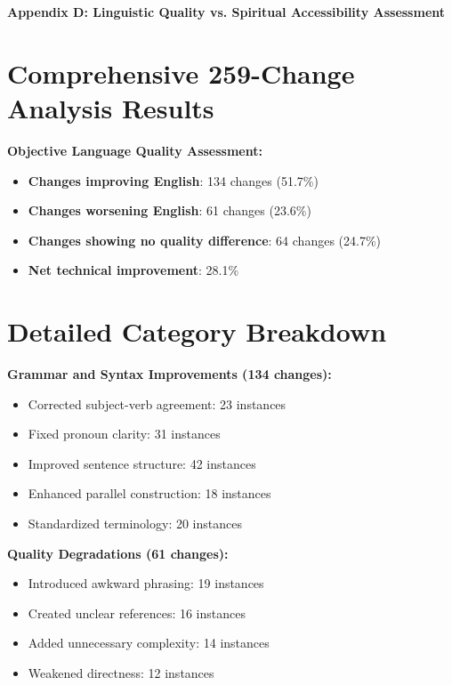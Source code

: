 \documentclass[11pt,twoside]{book}
\begin{document}
\clearpage
\pagestyle{sectionopening}
\thispagestyle{sectionopening}
\markboth{}{}
\markright{}
\vspace*{0.25\textheight}
\begin{center}
{\Huge\bfseries Appendix D: Linguistic Quality vs. Spiritual Accessibility Assessment}
\end{center}
\newpage
\section*{Comprehensive 259-Change Analysis Results}
\label{sec:orgb23dbeb}

\textbf{\textbf{Objective Language Quality Assessment:}}
\begin{itemize}
\item \textbf{\textbf{Changes improving English}}: 134 changes (51.7\%)
\item \textbf{\textbf{Changes worsening English}}: 61 changes (23.6\%)
\item \textbf{\textbf{Changes showing no quality difference}}: 64 changes (24.7\%)
\item \textbf{\textbf{Net technical improvement}}: 28.1\%
\end{itemize}
\section*{Detailed Category Breakdown}
\label{sec:orgcbc1bb8}

\textbf{\textbf{Grammar and Syntax Improvements (134 changes):}}
\begin{itemize}
\item Corrected subject-verb agreement: 23 instances
\item Fixed pronoun clarity: 31 instances
\item Improved sentence structure: 42 instances
\item Enhanced parallel construction: 18 instances
\item Standardized terminology: 20 instances
\end{itemize}

\textbf{\textbf{Quality Degradations (61 changes):}}
\begin{itemize}
\item Introduced awkward phrasing: 19 instances
\item Created unclear references: 16 instances
\item Added unnecessary complexity: 14 instances
\item Weakened directness: 12 instances
\end{itemize}
\end{document}
